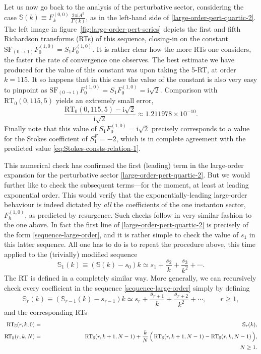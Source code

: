 \documentclass[11pt,a4paper]{article}
\def\BS{{\mathbb S}}
\newcommand{\be}{\begin{equation}}
\newcommand{\ee}{\end{equation}}
\newcommand{\rmi}{{\mathrm{i}}}
\begin{document}
Let us now go back to the analysis of the perturbative sector, considering the case $\BS(k) \equiv F_k^{(0,0)}\, \frac{2\pi\rmi A^k}{\Gamma(k)}$, as in the left-hand side of \eqref{large-order-pert-quartic-2}. The left image in figure~\ref{fig:large-order-pert-series} depicts the first and fifth Richardson transforms (RTs) of this sequence, closing-in on the constant $\mathrm{SF}_{(0\rightarrow1)} F_0^{(1,0)} = S_1 F_0^{(1,0)}$. It is rather clear how the more RTs one considers, the faster the rate of convergence one observes. The best estimate we have produced for the value of this constant was upon taking the 5-RT, at order $k=115$. It so happens that in this case the value of the constant is also very easy to pinpoint as $\mathrm{SF}_{(0\rightarrow1)} F_0^{(1,0)} = S_1 F_0^{(1,0)} = \rmi \sqrt{2}$. Comparison with $\mathrm{RT}_0 (0,115,5)$ yields an extremely small error,
%
\be
\frac{\mathrm{RT}_0 (0,115,5) - \rmi \sqrt{2}}{\rmi \sqrt{2}} \approx 1.211978 \times 10^{-10}.
\ee
%
\noindent
Finally note that this value of $S_1 F_0^{(1,0)} = \rmi \sqrt{2}$ precisely corresponds to a value for the Stokes coefficient of $S_1^{F}=-2$, which is in complete agreement with the predicted value \eqref{eq:Stokes-consts-relation-1}.

This numerical check has confirmed the first (leading) term in the large-order expansion for the perturbative sector \eqref{large-order-pert-quartic-2}. But we would further like to check the subsequent terms---for the moment, at least at leading exponential order. This would verify that the exponentially-leading large-order behaviour is indeed dictated by \textit{all} the coefficients of the one instanton sector, $F_h^{(1,0)}$, as predicted by resurgence. Such checks follow in very similar fashion to the one above. In fact the first line of \eqref{large-order-pert-quartic-2} is precisely of the form \eqref{sequence-large-order}, and it is rather simple to check the value of $s_1$ in this latter sequence. All one has to do is to repeat the procedure above, this time applied to the (trivially) modified sequence
%
\be
\BS_1(k) \equiv \left( \BS(k) - s_0 \right) k \simeq s_1 + \frac{s_2}{k} + \frac{s_3}{k^2} + \cdots.
\ee
%
\noindent
The RT is defined in a completely similar way. More generally, we can recursively check every coefficient in the sequence \eqref{sequence-large-order} simply by defining
%
\be
\BS_r (k) \equiv \left( \BS_{r-1}(k) - s_{r-1} \right) k \simeq s_r + \frac{s_{r+1}}{k} + \frac{s_{r+2}}{k^2} + \cdots, \qquad r \ge 1,
\ee
%
\noindent
and the corresponding RTs
%
\begin{eqnarray}
\mathrm{RT}_{\BS} (r,k,0) &=& \BS_r (k), \\
\mathrm{RT}_{\BS} (r,k,N) &=& \mathrm{RT}_{\BS} (r,k+1,N-1) + \frac{k}{N}\, \Big(\, \mathrm{RT}_{\BS} (r,k+1,N-1) - \mathrm{RT}_{\BS} (r,k,N-1)\, \Big), \\
&&
\hspace{+340pt} N \ge 1. \nonumber
\end{eqnarray}
\end{document}
